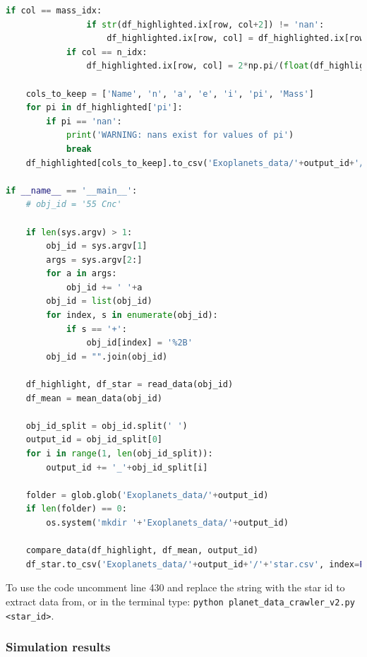 \documentclass[11pt, oneside]{article}   	%
\begin{document}
\begin{lstlisting}[language=Python, caption={Extracting data from \href{https://exoplanetarchive.ipac.caltech.edu/}{Nasa Exoplanet Archive}}]
            if col == mass_idx:
                if str(df_highlighted.ix[row, col+2]) != 'nan':
                    df_highlighted.ix[row, col] = df_highlighted.ix[row, col+2]
            if col == n_idx:
                df_highlighted.ix[row, col] = 2*np.pi/(float(df_highlighted.ix[row, col])/365)*180/np.pi
    
    cols_to_keep = ['Name', 'n', 'a', 'e', 'i', 'pi', 'Mass']
    for pi in df_highlighted['pi']:
        if pi == 'nan':
            print('WARNING: nans exist for values of pi')
            break
    df_highlighted[cols_to_keep].to_csv('Exoplanets_data/'+output_id+'/'+'planets.csv', index=False)

if __name__ == '__main__':
    # obj_id = '55 Cnc'

    if len(sys.argv) > 1:
        obj_id = sys.argv[1]
        args = sys.argv[2:]
        for a in args:
            obj_id += ' '+a
        obj_id = list(obj_id)
        for index, s in enumerate(obj_id):
            if s == '+':
                obj_id[index] = '%2B'
        obj_id = "".join(obj_id)

    df_highlight, df_star = read_data(obj_id)
    df_mean = mean_data(obj_id)

    obj_id_split = obj_id.split(' ')
    output_id = obj_id_split[0]
    for i in range(1, len(obj_id_split)):
        output_id += '_'+obj_id_split[i]

    folder = glob.glob('Exoplanets_data/'+output_id)
    if len(folder) == 0:
        os.system('mkdir '+'Exoplanets_data/'+output_id)

    compare_data(df_highlight, df_mean, output_id)
    df_star.to_csv('Exoplanets_data/'+output_id+'/'+'star.csv', index=False)

\end{lstlisting}

To use the code uncomment line 430 and replace the string with the star id to extract data from, or in the terminal type: \texttt{python planet\_data\_crawler\_v2.py <star\_id>}.

\subsubsection{Simulation results}
\end{document}
